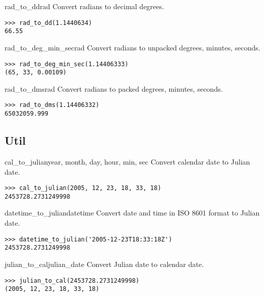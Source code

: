 \documentclass{howto}
\begin{document}
\begin{funcdesc}{rad_to_dd}{rad}
   Convert radians to decimal degrees.

\begin{verbatim}
>>> rad_to_dd(1.1440634)
66.55
\end{verbatim}
\end{funcdesc}

\begin{funcdesc}{rad_to_deg_min_sec}{rad}
   Convert radians to unpacked degrees, minutes, seconds.

\begin{verbatim}
>>> rad_to_deg_min_sec(1.14406333)
(65, 33, 0.00109)
\end{verbatim}
\end{funcdesc}

\begin{funcdesc}{rad_to_dms}{rad}
    Convert radians to packed degrees, minutes, seconds.

\begin{verbatim}
>>> rad_to_dms(1.14406332)
65032059.999
\end{verbatim}
\end{funcdesc}


\subsection{Util \label{util}}

\begin{funcdesc}{cal_to_julian}{year, month, day, hour, min, sec}
    Convert calendar date to Julian date.

\begin{verbatim}
>>> cal_to_julian(2005, 12, 23, 18, 33, 18)
2453728.2731249998
\end{verbatim}
\end{funcdesc}

\begin{funcdesc}{datetime_to_julian}{datetime}
    Convert date and time in ISO 8601 format to Julian date.

\begin{verbatim}
>>> datetime_to_julian('2005-12-23T18:33:18Z')
2453728.2731249998
\end{verbatim}
\end{funcdesc}

\begin{funcdesc}{julian_to_cal}{julian_date}
    Convert Julian date to calendar date.

\begin{verbatim}
>>> julian_to_cal(2453728.2731249998)
(2005, 12, 23, 18, 33, 18)
\end{verbatim}
\end{funcdesc}
\end{document}
